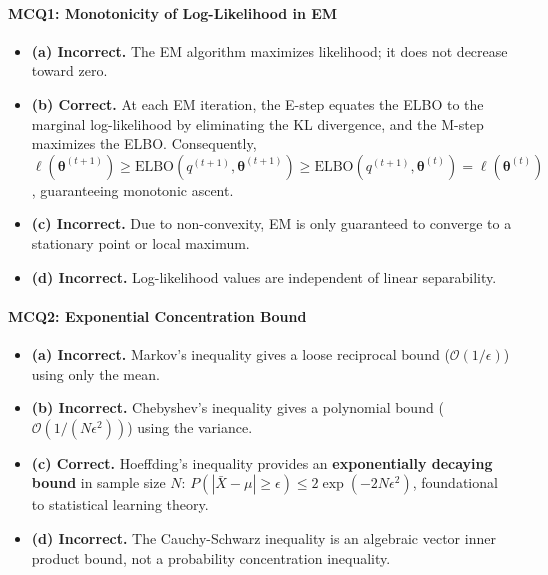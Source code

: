 \paragraph{MCQ1: Monotonicity of Log-Likelihood in EM}
\begin{itemize}
    \item \textbf{(a) Incorrect.} The EM algorithm maximizes likelihood; it does not decrease toward zero.
    \item \textbf{(b) Correct.} At each EM iteration, the E-step equates the ELBO to the marginal log-likelihood by eliminating the KL divergence, and the M-step maximizes the ELBO. Consequently, $\ell(\boldsymbol{\theta}^{(t+1)}) \ge \text{ELBO}(q^{(t+1)}, \boldsymbol{\theta}^{(t+1)}) \ge \text{ELBO}(q^{(t+1)}, \boldsymbol{\theta}^{(t)}) = \ell(\boldsymbol{\theta}^{(t)})$, guaranteeing monotonic ascent.
    \item \textbf{(c) Incorrect.} Due to non-convexity, EM is only guaranteed to converge to a stationary point or local maximum.
    \item \textbf{(d) Incorrect.} Log-likelihood values are independent of linear separability.
\end{itemize}

\paragraph{MCQ2: Exponential Concentration Bound}
\begin{itemize}
    \item \textbf{(a) Incorrect.} Markov's inequality gives a loose reciprocal bound ($\mathcal{O}(1/\epsilon)$) using only the mean.
    \item \textbf{(b) Incorrect.} Chebyshev's inequality gives a polynomial bound ($\mathcal{O}(1/(N\epsilon^2))$) using the variance.
    \item \textbf{(c) Correct.} Hoeffding's inequality provides an \textbf{exponentially decaying bound} in sample size $N$: $P(|\bar{X} - \mu| \ge \epsilon) \le 2\exp(-2N\epsilon^2)$, foundational to statistical learning theory.
    \item \textbf{(d) Incorrect.} The Cauchy-Schwarz inequality is an algebraic vector inner product bound, not a probability concentration inequality.
\end{itemize}

